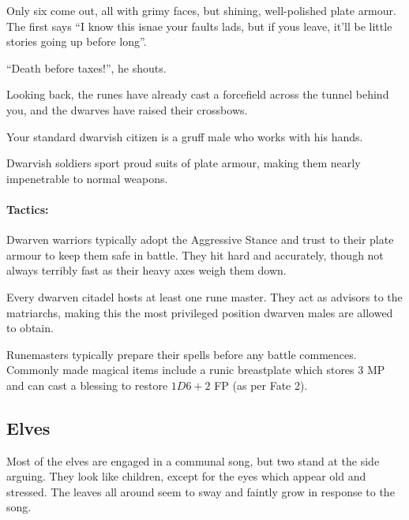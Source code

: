\begin{multicols}{2}
\begin{boxtext}
	Only six come out, all with grimy faces, but shining, well-polished plate armour.
	The first says ``I know this isnae your faults lads, but if yous leave, it'll be little stories going up before long''.

	``Death before taxes!'', he shouts.

	Looking back, the runes have already cast a forcefield across the tunnel behind you, and the dwarves have raised their crossbows.

\end{boxtext}

\label{dwarven_trader}

Your standard dwarvish citizen is a gruff male who works with his hands.

\dwarventrader

\label{dwarven_soldier}

Dwarvish soldiers sport proud suits of plate armour, making them nearly impenetrable to normal weapons.


\paragraph{Tactics:} Dwarven  warriors typically adopt the Aggressive Stance and trust to their plate armour to keep them safe in battle.
They hit hard and accurately, though not always terribly fast as their heavy axes weigh them down.

\label{dwarven_runemaster}

Every dwarven citadel hosts at least one rune master.  They act as advisors to the matriarchs, making this the most privileged position dwarven males are allowed to obtain.

\dwarvenrunemaster

Runemasters typically prepare their spells before any battle commences.
Commonly made magical items include a runic breastplate which stores 3 MP and can cast  a blessing to restore $1D6+2$ FP (as per Fate 2).

\subsection{Elves}

\begin{boxtext}

	Most of the elves are engaged in a communal song, but two stand at the side arguing.
	They look like children, except for the eyes which appear old and stressed.
	The leaves all around seem to sway and faintly grow in response to the song.


\end{boxtext}
\end{multicols}

